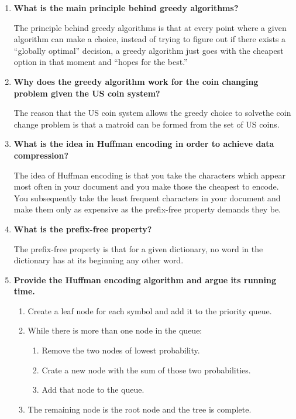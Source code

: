 \documentclass[a4paper,11pt]{article}
\begin{document}
\begin{enumerate}
\def\labelenumi{\arabic{enumi}.}
\item
  \textbf{What is the main principle behind greedy algorithms?}

  The principle behind greedy algorithms is that at every point where a
  given algorithm can make a choice, instead of trying to figure out if
  there exists a ``globally optimal'' decision, a greedy algorithm just
  goes with the cheapest option in that moment and ``hopes for the
  best.''
\item
  \textbf{Why does the greedy algorithm work for the coin changing
  problem given the US coin system?}

  The reason that the US coin system allows the greedy choice to
  solvethe coin change problem is that a matroid can be formed from the
  set of US coins.
\item
  \textbf{What is the idea in Huffman encoding in order to achieve data
  compression?}

  The idea of Huffman encoding is that you take the characters which
  appear most often in your document and you make those the cheapest to
  encode. You subsequently take the least frequent characters in your
  document and make them only as expensive as the prefix-free property
  demands they be.
\item
  \textbf{What is the prefix-free property?}

  The prefix-free property is that for a given dictionary, no word in
  the dictionary has at its beginning any other word.
\item
  \textbf{Provide the Huffman encoding algorithm and argue its running
  time.}

  \begin{enumerate}
  \def\labelenumii{\arabic{enumii}.}
  \itemsep1pt\parskip0pt
  \item
    Create a leaf node for each symbol and add it to the priority queue.
  \item
    While there is more than one node in the queue:

    \begin{enumerate}
    \def\labelenumiii{\arabic{enumiii}.}
    \itemsep1pt\parskip0pt
    \item
      Remove the two nodes of lowest probability.
    \item
      Crate a new node with the sum of those two probabilities.
    \item
      Add that node to the queue.
    \end{enumerate}
  \item
    The remaining node is the root node and the tree is complete.
  \end{enumerate}


\end{enumerate}
\end{document}

